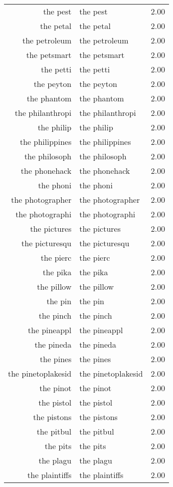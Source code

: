 \begin{table}[ht]
\begin{tabular}{rlr}
  the pest & the pest & 2.00 \\ 
  the petal & the petal & 2.00 \\ 
  the petroleum & the petroleum & 2.00 \\ 
  the petsmart & the petsmart & 2.00 \\ 
  the petti & the petti & 2.00 \\ 
  the peyton & the peyton & 2.00 \\ 
  the phantom & the phantom & 2.00 \\ 
  the philanthropi & the philanthropi & 2.00 \\ 
  the philip & the philip & 2.00 \\ 
  the philippines & the philippines & 2.00 \\ 
  the philosoph & the philosoph & 2.00 \\ 
  the phonehack & the phonehack & 2.00 \\ 
  the phoni & the phoni & 2.00 \\ 
  the photographer & the photographer & 2.00 \\ 
  the photographi & the photographi & 2.00 \\ 
  the pictures & the pictures & 2.00 \\ 
  the picturesqu & the picturesqu & 2.00 \\ 
  the pierc & the pierc & 2.00 \\ 
  the pika & the pika & 2.00 \\ 
  the pillow & the pillow & 2.00 \\ 
  the pin & the pin & 2.00 \\ 
  the pinch & the pinch & 2.00 \\ 
  the pineappl & the pineappl & 2.00 \\ 
  the pineda & the pineda & 2.00 \\ 
  the pines & the pines & 2.00 \\ 
  the pinetoplakesid & the pinetoplakesid & 2.00 \\ 
  the pinot & the pinot & 2.00 \\ 
  the pistol & the pistol & 2.00 \\ 
  the pistons & the pistons & 2.00 \\ 
  the pitbul & the pitbul & 2.00 \\ 
  the pits & the pits & 2.00 \\ 
  the plagu & the plagu & 2.00 \\ 
  the plaintiffs & the plaintiffs & 2.00 \\ 

\end{tabular}
\end{table}
